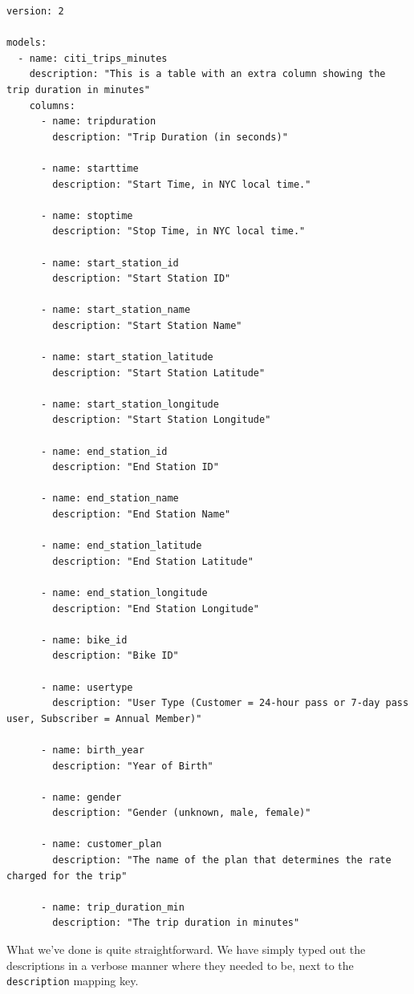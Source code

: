 \documentclass[
]{book}
\begin{document}
\begin{verbatim}
version: 2

models:
  - name: citi_trips_minutes
    description: "This is a table with an extra column showing the trip duration in minutes"
    columns:
      - name: tripduration
        description: "Trip Duration (in seconds)"

      - name: starttime
        description: "Start Time, in NYC local time."
      
      - name: stoptime
        description: "Stop Time, in NYC local time."

      - name: start_station_id
        description: "Start Station ID"
      
      - name: start_station_name
        description: "Start Station Name"

      - name: start_station_latitude
        description: "Start Station Latitude"
      
      - name: start_station_longitude
        description: "Start Station Longitude"

      - name: end_station_id
        description: "End Station ID"

      - name: end_station_name
        description: "End Station Name"

      - name: end_station_latitude
        description: "End Station Latitude"

      - name: end_station_longitude
        description: "End Station Longitude"
      
      - name: bike_id
        description: "Bike ID"
      
      - name: usertype
        description: "User Type (Customer = 24-hour pass or 7-day pass user, Subscriber = Annual Member)"

      - name: birth_year
        description: "Year of Birth"

      - name: gender
        description: "Gender (unknown, male, female)"

      - name: customer_plan
        description: "The name of the plan that determines the rate charged for the trip"

      - name: trip_duration_min
        description: "The trip duration in minutes"
\end{verbatim}

What we've done is quite straightforward. We have simply typed out the descriptions in a verbose manner where they needed to be, next to the \texttt{description} mapping key.
\end{document}
